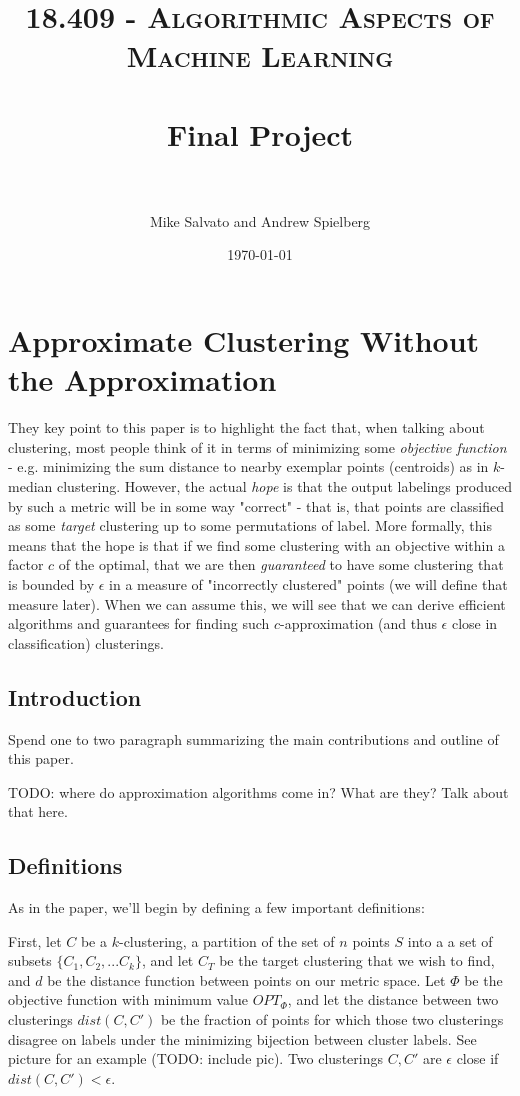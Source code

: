 \documentclass[paper=a4, fontsize=11pt]{scrartcl} %
\title{	
\normalfont \normalsize 
\textsc{18.409 - Algorithmic Aspects of Machine Learning} \\ [25pt] %
\horrule{0.5pt} \\[0.4cm] %
\huge Final Project \\ %
\horrule{2pt} \\[0.5cm] %
}
\author{Mike Salvato and Andrew Spielberg} %
\date{\normalsize\today} %
\numberwithin{equation}{section} %
\numberwithin{figure}{section} %
\numberwithin{table}{section} %
\begin{document}
\maketitle %


\section{Approximate Clustering Without the Approximation}


They key point to this paper is to highlight the fact that, when talking about clustering, most people think of it in terms of minimizing some \emph{objective function} - e.g. minimizing the sum distance to nearby exemplar points (centroids) as in $k$-median clustering.  However, the actual \emph{hope} is that the output labelings produced by such a metric will be in some way "correct" - that is, that points are classified as some \emph{target} clustering up to some permutations of label.  More formally, this means that the hope is that if we find some clustering with an objective within a factor $c$ of the optimal, that we are then \emph{guaranteed} to have some clustering that is bounded by $\epsilon$ in a measure of "incorrectly clustered" points (we will define that measure later).  When we can assume this, we will see that we can derive efficient algorithms and guarantees for finding such $c$-approximation (and thus $\epsilon$ close in classification) clusterings.

\subsection{Introduction}

Spend one to two paragraph summarizing the main contributions and outline of this paper.

TODO: where do approximation algorithms come in?  What are they?  Talk about that here.

\subsection{Definitions}
As in the paper, we'll begin by defining a few important definitions:

First, let $C$ be a $k$-clustering, a partition of the set of $n$ points $S$ into a a set of subsets $\{C_1, C_2, ...C_k\}$, and let $C_T$ be the target clustering that we wish to find, and $d$ be the distance function between points on our metric space.  Let $\Phi$ be the objective function with minimum value $OPT_{\Phi}$, and let the distance between two clusterings $dist(C, C')$ be the 
fraction of points for which those two clusterings disagree on labels under the minimizing bijection between cluster labels.  See picture for an example (TODO: include pic).  Two clusterings $C, C'$ are $\epsilon$ close if $dist(C, C') < \epsilon$.
\end{document}
